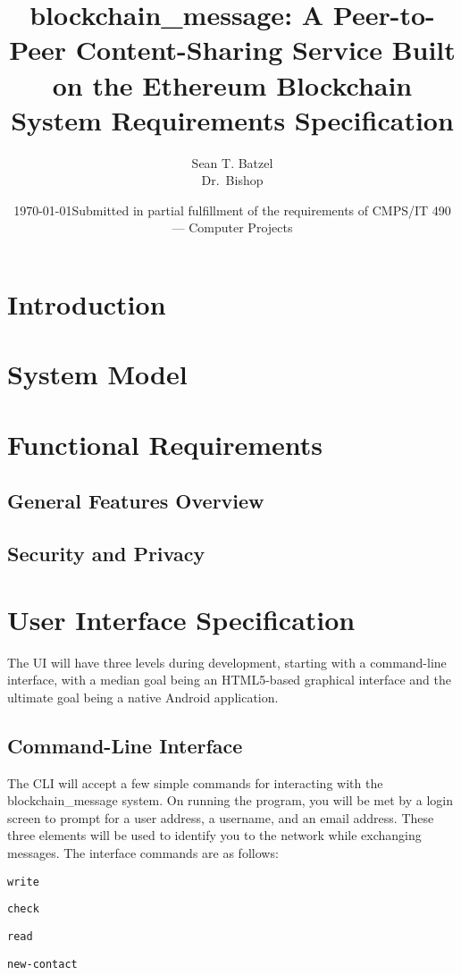 \documentclass[titlepage]{report}
\title{blockchain\_message: A Peer-to-Peer Content-Sharing Service Built on the Ethereum Blockchain\\\large System Requirements Specification}
\author{Sean T. Batzel\\Dr.\ Bishop}
\date{\today\endgraf\bigskip Submitted in partial fulfillment of the requirements of CMPS/IT 490 --- Computer Projects}
\begin{document}
\maketitle

\nocite{*}

\section{Introduction}

\section{System Model}

\section{Functional Requirements}
\subsection{General Features Overview}
\subsection{Security and Privacy}

\section{User Interface Specification}
The UI will have three levels during development, starting with a command-line interface, with a median goal being an HTML5-based graphical interface and the ultimate goal being a native Android application.

\subsection{Command-Line Interface}
The CLI will accept a few simple commands for interacting with the blockchain\_message system. On running the program, you will be met by a login screen to prompt for a user address, a username, and an email address. These three elements will be used to identify you to the network while exchanging messages.
The interface commands are as follows:

\texttt{write}

\texttt{check}

\texttt{read}

\texttt{new-contact}
\end{document}

